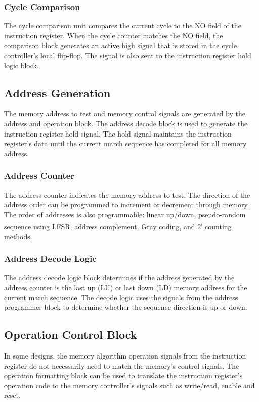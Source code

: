 \subsubsection{Cycle Comparison}
The cycle comparison unit compares the current cycle to the NO field of the instruction register.  When the cycle counter matches the NO field, the comparison block generates an active high signal that is stored in the cycle controller's local flip-flop.  The signal is also sent to the instruction register hold logic block.  

\subsection{Address Generation}
The memory address to test and memory control signals are generated by the address and operation block.  The address decode block is used to generate the instruction register hold signal.  The hold signal maintains the instruction register's data until the current march sequence has completed for all memory address.  

\subsubsection{Address Counter}
The address counter indicates the memory address to test.  The direction of the address order can be programmed to increment or decrement through memory.  The order of addresses is also programmable: linear up/down, pseudo-random sequence using LFSR, address complement, Gray coding, and 2\textsuperscript{i} counting methods.
 
\subsubsection{Address Decode Logic}
The address decode logic block determines if the address generated by the address counter is the last up (LU) or last down (LD) memory address for the current march sequence.  The decode logic uses the signals from the address programmer block to determine whether the sequence direction is up or down.   

\subsection{Operation Control Block}
In some designs, the memory algorithm operation signals from the instruction register do not necessarily need to match the memory's control signals.  The operation formatting block can be used to translate the instruction register's operation code to the memory controller's signals such as write/read, enable and reset.

